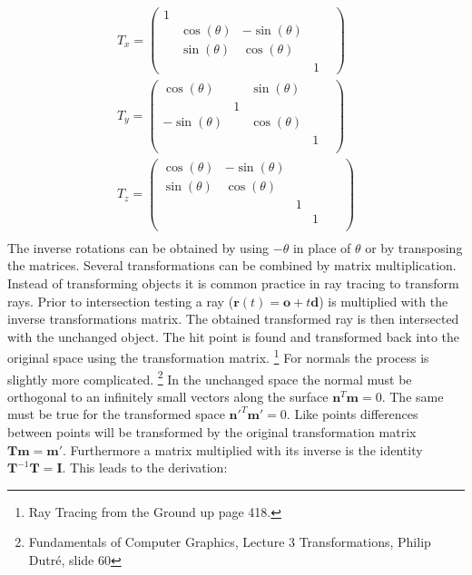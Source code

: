\begin{align}
T_x = \begin{pmatrix}
	1&		&		&		&				\\
	&		\cos(\theta)&	-\sin(\theta)&	\\
    &		\sin(\theta)&	\cos(\theta)	&	\\
	&		&		&		1				
\end{pmatrix} \\
T_y = \begin{pmatrix}
\cos(\theta) &	    &		\sin(\theta) &	 &	\\
	         &	   1&	                &	 &	\\
-\sin(\theta) &	    &		\cos(\theta) &	& 	\\
		     &	    &		            &		1 \\\end{pmatrix} \\
T_z = \begin{pmatrix}
\cos(\theta)&	-\sin(\theta)&  & &	 &	\\
\sin(\theta)&	\cos(\theta)&&	                &	 &	\\
            &    &		1 &	& 	\\
		     &	    &		            &		1 \\
\end{pmatrix} \\
\end{align}
The inverse rotations can be obtained by using $-\theta$ in place of $\theta$ or by transposing the matrices. Several
transformations can be combined by matrix multiplication. \\
Instead of transforming objects it is common practice in ray tracing to transform rays. Prior to intersection testing
a ray ($\mathbf{r}(t) = \mathbf{o} + t\mathbf{d}$) is multiplied with the inverse transformations matrix. The obtained transformed ray is then intersected with the unchanged object. The hit point is found and transformed back into the
original space using the transformation matrix. \footnote{Ray Tracing from the Ground up page 418.} 
For normals the process is slightly more complicated. \footnote{ Fundamentals of
Computer Graphics, Lecture 3 Transformations, Philip Dutr\'e,  slide 60}
In the unchanged space the normal must be orthogonal to an infinitely small vectors along the surface $\mathbf{n}^T \mathbf{m} = 0$. The same must be true for the transformed space $\mathbf{n'}^T\mathbf{m'} = 0$. Like points differences between points will be transformed by the original transformation matrix $\mathbf{Tm} = \mathbf{m}'$. Furthermore a matrix multiplied with its inverse is the identity $\mathbf{T}^{-1}\mathbf{T} = \mathbf{I}$. This leads to the derivation:
